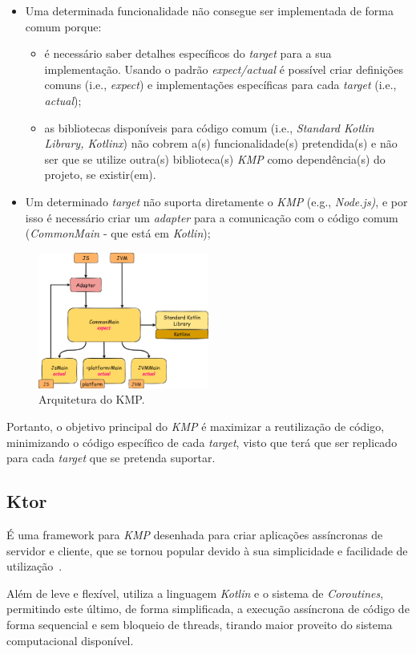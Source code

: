 \begin{itemize}[topsep=0pt,itemsep=0pt,partopsep=0pt, parsep=0pt]
    \item Uma determinada funcionalidade não consegue ser implementada de forma comum porque:
    \begin{itemize}[topsep=0pt,itemsep=0pt,partopsep=0pt, parsep=0pt]
        \item é necessário saber detalhes específicos do \textit{target} para a sua implementação.
        Usando o padrão \textit{expect/actual} é possível criar definições comuns (i.e., \textit{expect}) e implementações específicas para cada \textit{target} (i.e., \textit{actual});
        \item as bibliotecas disponíveis para código comum (i.e., \textit{Standard Kotlin Library, Kotlinx}) não cobrem a(s) funcionalidade(s) pretendida(s) e não ser que se utilize outra(s) biblioteca(s) \textit{KMP} como dependência(s) do projeto, se existir(em).
    \end{itemize}
    \item Um determinado \textit{target} não suporta diretamente o \textit{KMP} (e.g., \textit{Node.js)}, e por isso é necessário criar um \textit{adapter} para a comunicação com o código comum (\textit{CommonMain} - que está em \textit{Kotlin});
\end{itemize}

\begin{figure}[H]
    \centering
    \includegraphics[width=0.5\textwidth]{../docs/imgs/kmp-architecture}
    \caption{Arquitetura do KMP.}
    \label{fig:kmp-architecture}
\end{figure}

Portanto, o objetivo principal do \textit{KMP} é maximizar a reutilização de código, minimizando o código específico de cada \textit{target}, visto que terá que ser replicado para cada \textit{target} que se pretenda suportar.

\subsection{Ktor}\label{subsec:ktor}

É uma framework para \textit{KMP} desenhada para criar aplicações assíncronas de
servidor e cliente, que se tornou popular devido à sua simplicidade e facilidade de utilização~\cite{ktor}.

Além de leve e flexível, utiliza a linguagem \textit{Kotlin} e o sistema de \textit{Coroutines}, permitindo este último, de forma simplificada, a execução
assíncrona de código de forma sequencial e sem bloqueio de threads, tirando maior proveito do sistema computacional disponível.